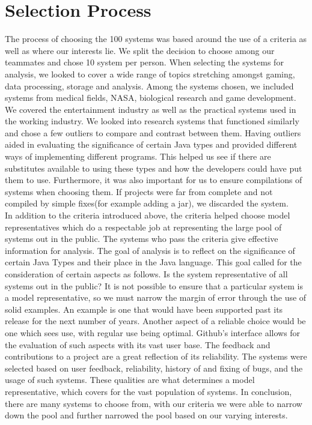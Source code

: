 \documentclass{assignment}
\begin{document}
\section*{Selection Process}

	The process of choosing the 100 systems was based around the use of a criteria as well as where our interests lie. We split the decision to choose among our teammates and chose 10 system per person. When selecting the systems for analysis, we looked to cover a wide range of topics stretching amongst gaming, data processing, storage and analysis. Among the systems chosen, we included systems from medical fields, NASA, biological research and game development. We covered the entertainment industry as well as the practical systems used in the working industry. We looked into research systems that functioned similarly and chose a few outliers to compare and contrast between them. Having outliers aided in evaluating the significance of certain Java types and provided different ways of implementing different programs. This helped us see if there are substitutes available to using these types and how the developers could have put them to use. Furthermore, it was also important for us to ensure compilations of systems when choosing them. If projects were far from complete and not compiled by simple fixes(for example adding a jar), we discarded the system.\\

	In addition to the criteria introduced above, the criteria helped choose model representatives which do a respectable job at representing the large pool of systems out in the public. The systems who pass the criteria give effective information for analysis. The goal of analysis is to reflect on the significance of certain Java Types and their place in the Java language. This goal called for the consideration of certain aspects as follows.  Is the system representative of all systems out in the public? It is not possible to ensure that a particular system is a model representative, so we must narrow the margin of error through the use of solid examples. An example is one that would have been supported past its release for the next number of years. Another aspect of a reliable choice would be one which sees use, with regular use being optimal. Github’s interface allows for the evaluation of such aspects with its vast user base. The feedback and contributions to a project are a great reflection of its reliability. The systems were selected based on user feedback, reliability, history of and fixing of bugs, and the usage of such systems. These qualities are what determines a model representative, which covers for the vast population of systems. In conclusion, there are many systems to choose from, with our criteria we were able to narrow down the pool and further narrowed the pool based on our varying interests.\\
\end{document}
